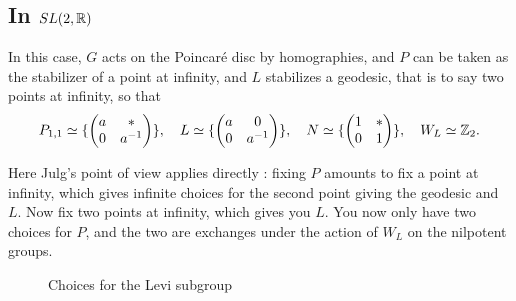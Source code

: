 \subsection{In $SL(2,\mathbb R)$}

In this case, $G$ acts on the Poincaré disc by homographies, and $P$ can be taken as the stabilizer of a point at infinity, and $L$ stabilizes a geodesic, that is to say two points at infinity, so that
\[P_{1,1}\simeq\{\begin{pmatrix}a & * \\ 0 & a^{-1}\end{pmatrix}\},\quad
L\simeq\{\begin{pmatrix}a & 0\\ 0 & a^{-1}\end{pmatrix}\},\quad
N\simeq\{\begin{pmatrix}1 & * \\ 0 & 1\end{pmatrix}\},\quad
W_L\simeq \mathbb Z_2.
\]

Here Julg's point of view applies directly : fixing $P$ amounts to fix a point at infinity, which gives infinite choices for the second point giving the geodesic and $L$. Now fix two points at infinity, which gives you $L$. You now only have two choices for $P$, and the two are exchanges under the action of $W_L$ on the nilpotent groups.\\

\begin{figure}[h]\centering
{}
\caption{Choices for the Levi subgroup}
\label{fig:Levi}
\end{figure}






















